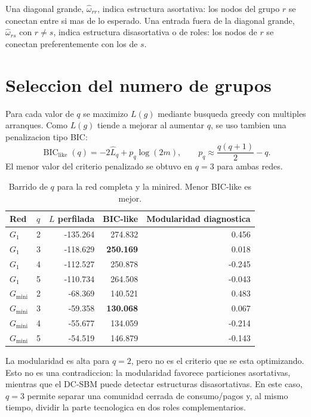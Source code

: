 \documentclass[11pt,letterpaper]{article}
\newcommand{\Gmini}{G_{\mathrm{mini}}}
\begin{document}
Una diagonal grande, $\hat\omega_{rr}$, indica estructura asortativa: los nodos del grupo $r$ se conectan entre si mas de lo esperado. Una entrada fuera de la diagonal grande, $\hat\omega_{rs}$ con $r\ne s$, indica estructura disasortativa o de roles: los nodos de $r$ se conectan preferentemente con los de $s$.

\section{Seleccion del numero de grupos}

Para cada valor de $q$ se maximizo $L(g)$ mediante busqueda greedy con multiples arranques. Como $L(g)$ tiende a mejorar al aumentar $q$, se uso tambien una penalizacion tipo BIC:
\[
    \operatorname{BIC}_{\mathrm{like}}(q)
    =
    -2\hat L_q+p_q\log(2m),
    \qquad
    p_q\approx \frac{q(q+1)}{2}-q.
\]
El menor valor del criterio penalizado se obtuvo en $q=3$ para ambas redes.

\begin{table}[H]
\centering
\caption{Barrido de $q$ para la red completa y la minired. Menor BIC-like es mejor.}
\begin{tabular}{llrrr}
\toprule
Red & $q$ & $L$ perfilada & BIC-like & Modularidad diagnostica\\
\midrule
$G_1$ & 2 & -135.264 & 274.832 & 0.456\\
$G_1$ & 3 & -118.629 & \textbf{250.169} & 0.018\\
$G_1$ & 4 & -112.527 & 250.878 & -0.245\\
$G_1$ & 5 & -110.734 & 264.508 & -0.043\\
\midrule
$\Gmini$ & 2 & -68.369 & 140.521 & 0.483\\
$\Gmini$ & 3 & -59.358 & \textbf{130.068} & 0.067\\
$\Gmini$ & 4 & -55.677 & 134.059 & -0.214\\
$\Gmini$ & 5 & -54.519 & 146.879 & -0.143\\
\bottomrule
\end{tabular}
\end{table}

La modularidad es alta para $q=2$, pero no es el criterio que se esta optimizando. Esto no es una contradiccion: la modularidad favorece particiones asortativas, mientras que el DC-SBM puede detectar estructuras disasortativas. En este caso, $q=3$ permite separar una comunidad cerrada de consumo/pagos y, al mismo tiempo, dividir la parte tecnologica en dos roles complementarios.
\end{document}
